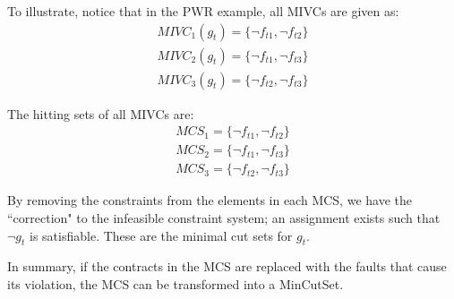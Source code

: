 To illustrate, notice that in the PWR example, all MIVCs are given as: 
$$\boxed{
	\begin{aligned}
		MIVC_1(g_t) = \{\neg f_{t1}, \neg f_{t2}\} \\
		MIVC_2(g_t) = \{\neg f_{t1}, \neg f_{t3}\} \\
		MIVC_3(g_t) = \{\neg f_{t2}, \neg f_{t3}\}
	\end{aligned}
}$$

The hitting sets of all MIVCs are: 
 $$\boxed{
	\begin{aligned}
		MCS_1 = \{\neg f_{t1}, \neg f_{t2}\} \\
		MCS_2 = \{\neg f_{t1}, \neg f_{t3}\} \\
		MCS_3 = \{\neg f_{t2}, \neg f_{t3}\}
	\end{aligned}
}$$

By removing the constraints from the elements in each MCS, we have the ``correction" to the infeasible constraint system; an assignment exists such that $\neg g_t$ is satisfiable. These are the minimal cut sets for $g_t$. 

In summary, if the contracts in the MCS are replaced with the faults that cause its violation, the MCS can be transformed into a MinCutSet. 




